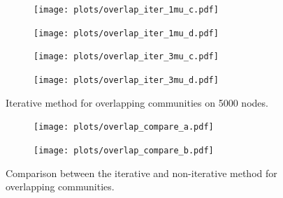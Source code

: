 %
\begin{figure}[h!]
    \centering
    \begin{subfigure}{0.4\textwidth}
    \centering
    \texttt{[image: plots/overlap\_iter\_1mu\_c.pdf]}
    \end{subfigure}%
    \begin{subfigure}{0.4\textwidth}
    \centering
    \texttt{[image: plots/overlap\_iter\_1mu\_d.pdf]}
    \end{subfigure}
    \begin{subfigure}{0.4\textwidth}
    \centering
    \texttt{[image: plots/overlap\_iter\_3mu\_c.pdf]}
    \end{subfigure}%
    \begin{subfigure}{0.4\textwidth}
    \centering
    \texttt{[image: plots/overlap\_iter\_3mu\_d.pdf]}
    \end{subfigure}
    \caption{Iterative method for overlapping communities on 5000 nodes.}\label{fig:iter_overlap_5000N}
\end{figure}
%
\begin{figure}[h!]
    \centering
    \begin{subfigure}{0.4\textwidth}
    \centering
    \texttt{[image: plots/overlap\_compare\_a.pdf]}
    \end{subfigure}%
    \begin{subfigure}{0.4\textwidth}
    \centering
    \texttt{[image: plots/overlap\_compare\_b.pdf]}
    \end{subfigure}
    \caption{Comparison between the iterative and non-iterative method for overlapping communities.}\label{fig:compare_iter_overlap}
\end{figure}
%

